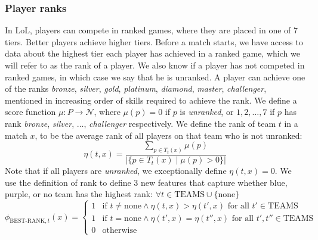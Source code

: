 \subsubsection{Player ranks}
In LoL, players can compete in ranked games, where they are placed in one of 7 tiers. Better players achieve higher tiers.
Before a match starts, we have access to data about the highest tier each player has achieved in a ranked game, which we will refer to as the rank of a player. We also know if a player has not competed in ranked games, in which case we say that he is unranked.
A player can achieve one of the ranks \textit{bronze}, \textit{silver}, \textit{gold}, \textit{platinum}, \textit{diamond}, \textit{master}, \textit{challenger}, mentioned in increasing order of skills required to achieve the rank.
We define a score function $\mu : P \rightarrow \mathcal{N}$, where $\mu(p) = 0$ if $p$ is \textit{unranked}, or $1, 2, \dots, 7$ if $p$ has rank \textit{bronze}, \textit{silver}, $\dots$, \textit{challenger} respectively.
We define the rank of team $t$ in a match $x$, to be the average rank of all players on that team who is not unranked:
\begin{equation}\label{eq:eta}
\eta(t, x) = \frac{\sum\limits_{p \in T_t(x)} \mu(p)}{|\{p \in T_t(x) \mid \mu(p) > 0\}|}
\end{equation}
Note that if all players are \textit{unranked}, we exceptionally define $\eta(t, x) = 0$. We use the definition of rank to define 3 new features that capture whether blue, purple, or no team has the highest rank:
$\forall t \in \text{TEAMS} \cup \{\text{none}\}$
\begin{equation}\label{eq:bestrank}
\phi_{\text{BEST-RANK},t}(x) = 
\begin{cases} 
  1 & \text{if } t \neq \text{none} \wedge \eta(t,x) > \eta(t',x) \text{ for all } t' \in \text{TEAMS}\\
  1 & \text{if } t = \text{none} \wedge \eta(t',x) = \eta(t'',x) \text{ for all } t',t'' \in \text{TEAMS}\\
  0 & \text{otherwise} 
\end{cases}  
\end{equation}

